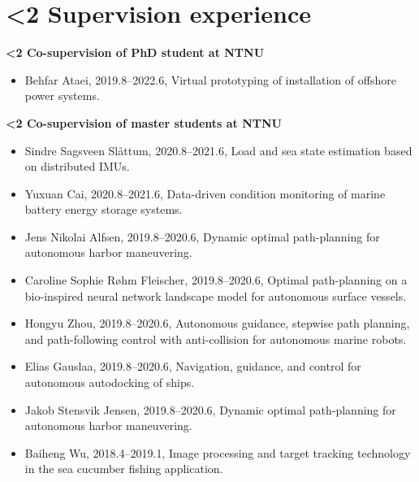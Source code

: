\documentclass[10pt]{ctexart}
\begin{document}
\vspace{-2em}
\section*{\textbf{\ifnum\value{num}<2 {Supervision experience}  \fi}}\vspace{-1.5em}
\textbf{\ifnum\value{num}<2 {Co-supervision of PhD student at NTNU}  \fi}\vspace{-1.00em}
\begin{itemize}[label={}] \setlength\itemsep{0.5em}
    \item Behfar Ataei, 2019.8--2022.6, Virtual prototyping of installation of offshore power systems.
\end{itemize}
\vspace*{0.1em}

\vspace{-0.8em}
\textbf{\ifnum\value{num}<2 {Co-supervision of master students at NTNU}  \fi}\vspace{-1.00em}
\begin{itemize}[label={}] \setlength\itemsep{0.5em}
    \item Sindre Sagsveen Sl{\aa}ttum, 2020.8--2021.6, Load and sea state estimation based on distributed IMUs.
    \item Yuxuan Cai, 2020.8--2021.6, Data-driven condition monitoring of marine battery energy
    storage systems.
    \item Jens Nikolai Alfsen, 2019.8--2020.6, Dynamic optimal path-planning for autonomous harbor maneuvering.
    \item Caroline Sophie R{\o}hm Fleischer, 2019.8--2020.6, Optimal path-planning on a bio-inspired neural network landscape model for autonomous surface vessels.
    \item Hongyu Zhou, 2019.8--2020.6, Autonomous guidance, stepwise path planning, and path-following control with anti-collision for autonomous marine robots.
    \item Elias Gauslaa, 2019.8--2020.6, Navigation, guidance, and control for autonomous autodocking of ships.
    \item Jakob Stensvik Jensen, 2019.8--2020.6, Dynamic optimal path-planning for autonomous harbor maneuvering.
    \item Baiheng Wu, 2018.4--2019.1, Image processing and target tracking technology in the sea cucumber fishing application.
\end{itemize}
\vspace*{0.1em}
\end{document}
